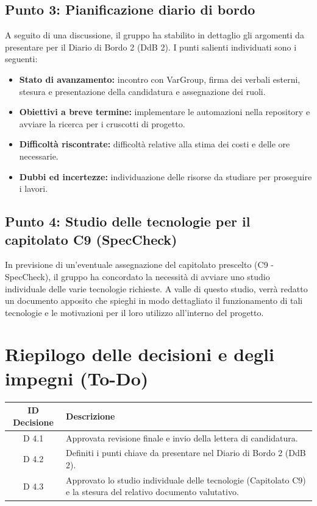 \documentclass[a4paper, 11pt]{article}
\begin{document}
\subsection{Punto 3: Pianificazione diario di bordo}
A seguito di una discussione, il gruppo ha stabilito in dettaglio gli argomenti da presentare per il Diario di Bordo 2 (DdB 2). I punti salienti individuati sono i seguenti:
\begin{itemize}
    \item \textbf{Stato di avanzamento:} incontro con VarGroup, firma dei verbali esterni, stesura e presentazione della candidatura e assegnazione dei ruoli.
    \item \textbf{Obiettivi a breve termine:} implementare le automazioni nella repository e avviare la ricerca per i cruscotti di progetto.
    \item \textbf{Difficoltà riscontrate:} difficoltà relative alla stima dei costi e delle ore necessarie.
    \item \textbf{Dubbi ed incertezze:} individuazione delle risorse da studiare per proseguire i lavori.
\end{itemize}

\subsection{Punto 4: Studio delle tecnologie per il capitolato C9 (SpecCheck)}
In previsione di un'eventuale assegnazione del capitolato prescelto (C9 - SpecCheck), il gruppo ha concordato la necessità di avviare uno studio individuale delle varie tecnologie richieste. A valle di questo studio, verrà redatto un documento apposito che spieghi in modo dettagliato il funzionamento di tali tecnologie e le motivazioni per il loro utilizzo all'interno del progetto.

\newpage


\section{Riepilogo delle decisioni e degli impegni (To-Do)}

\begin{tabularx}{\textwidth}{|c|X|}
    \hline
    \textbf{ID Decisione} & \textbf{Descrizione} \\ \hline
    D 4.1 & Approvata revisione finale e invio della lettera di candidatura. \\ \hline
    D 4.2 & Definiti i punti chiave da presentare nel Diario di Bordo 2 (DdB 2). \\ \hline
    D 4.3 & Approvato lo studio individuale delle tecnologie (Capitolato C9) e la stesura del relativo documento valutativo. \\ \hline
\end{tabularx}
\end{document}
